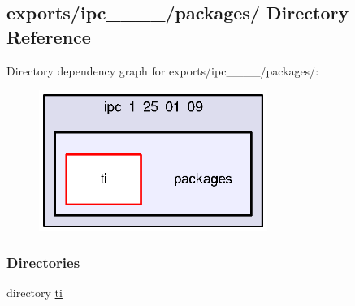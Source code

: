 \subsection{exports/ipc\-\_\-\_\-\_\-\_/packages/ Directory Reference}
\label{dir_c81e32b884ba855ce5587fd135c55c19}
Directory dependency graph for exports/ipc\-\_\-\_\-\_\-\_/packages/\-:
\nopagebreak
\begin{figure}[H]
\begin{center}
\leavevmode
\includegraphics[width=211pt]{dir_c81e32b884ba855ce5587fd135c55c19_dep}
\end{center}
\end{figure}
\subsubsection*{Directories}
\begin{DoxyCompactItemize}
\item 
directory \hyperlink{dir_c0dbe21f1895d63799b1abdb14544051}{ti}
\end{DoxyCompactItemize}
